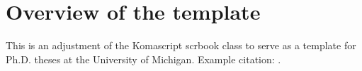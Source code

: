 
\chapter{Overview of the template}

This is an adjustment of the Komascript scrbook class to serve as a template for Ph.D. theses at the University of Michigan. Example citation: \cite{Shannon:1949ti}.
